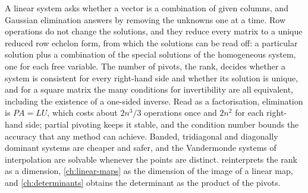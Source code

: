 \bigskip
A linear system asks whether a vector is a combination of given columns, and Gaussian elimination answers by removing the unknowns one at a time. Row operations do not change the solutions, and they reduce every matrix to a unique reduced row echelon form, from which the solutions can be read off: a particular solution plus a combination of the special solutions of the homogeneous system, one for each free variable. The number of pivots, the rank, decides whether a system is consistent for every right-hand side and whether its solution is unique, and for a square matrix the many conditions for invertibility are all equivalent, including the existence of a one-sided inverse. Read as a factorisation, elimination is $PA=LU$, which costs about $2n^3/3$ operations once and $2n^2$ for each right-hand side; partial pivoting keeps it stable, and the condition number bounds the accuracy that any method can achieve. Banded, tridiagonal and diagonally dominant systems are cheaper and safer, and the Vandermonde systems of interpolation are solvable whenever the points are distinct.  reinterprets the rank as a dimension, \cref{ch:linear-maps} as the dimension of the image of a linear map, and \cref{ch:determinants} obtains the determinant as the product of the pivots.

\chapternotes

